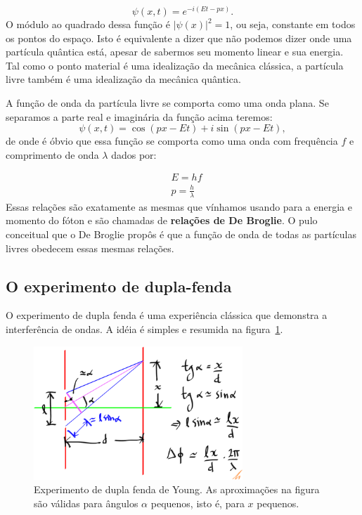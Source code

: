 \documentclass{article}
\begin{document}
\begin{equation}
\psi(x,t) = e^{-i(Et - px)}.
\end{equation}
O m\'odulo ao quadrado dessa fun\c c\~ao \'e $|\psi(x)|^2 = 1$, ou seja, constante em todos os pontos do espa\c co. Isto \'e equivalente a dizer que n\~ao podemos dizer onde uma part\'icula qu\^antica est\'a, apesar de sabermos seu momento linear e sua energia. Tal como o ponto material \'e uma idealiza\c c\~ao da mec\^anica cl\'assica, a part\'icula livre tamb\'em \'e uma idealiza\c c\~ao da mec\^anica qu\^antica.

A fun\c c\~ao de onda da part\'icula livre se comporta como uma onda plana. Se separamos a parte real e imagin\'aria da fun\c c\~ao acima teremos:
\begin{equation}
\psi(x,t) = \cos(px - Et) + i\sin(px - Et),
\end{equation}
de onde \'e \'obvio que essa fun\c c\~ao se comporta como uma onda com frequ\^encia $f$ e comprimento de onda $\lambda$ dados por:

\begin{equation}
\begin{split}
&E = hf\\
&p = \frac{h}{\lambda}
\end{split}
\end{equation}
Essas rela\c c\~oes s\~ao exatamente as mesmas que v\'inhamos usando para a energia e momento do f\'oton e s\~ao chamadas de \textbf{rela\c c\~oes de De Broglie}. O pulo conceitual que o De Broglie prop\^os \'e que a fun\c c\~ao de onda de todas as part\'iculas livres obedecem essas mesmas rela\c c\~oes.

\subsection{O experimento de dupla-fenda}

O experimento de dupla fenda \'e uma experi\^encia cl\'assica que demonstra a interfer\^encia de ondas. A id\'eia \'e simples e resumida na figura~\ref{fig:dupla_fenda}.

\begin{figure}[ht]
\begin{center}
\includegraphics[width=0.7\textwidth]{dupla_fenda.png}
\caption{\label{fig:dupla_fenda} Experimento de dupla fenda de Young. As aproxima\c c\~oes na figura s\~ao v\'alidas para \^angulos $\alpha$ pequenos, isto \'e, para $x$ pequenos.}
\end{center}
\end{figure}
\end{document}
